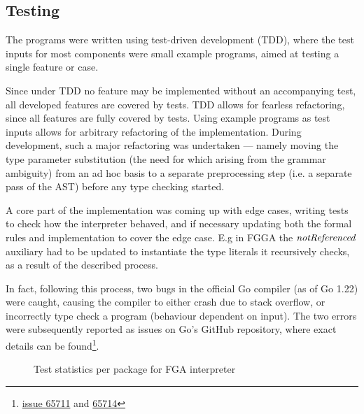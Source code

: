 \subsection{Testing}

The programs were written using test-driven development (TDD), where the test
inputs for most components were small example programs, aimed at testing a
single feature or case.

Since under TDD no feature may be implemented without an accompanying test, all
developed features are covered by tests. TDD allows for fearless refactoring,
since all features are fully covered by tests. Using example programs as test
inputs allows for arbitrary refactoring of the implementation. During
development, such a major refactoring was undertaken --- namely moving the type
parameter substitution (the need for which arising from the grammar ambiguity)
from an ad hoc basis to a separate preprocessing step (i.e. a separate pass of
the AST) before any type checking started.

A core part of the implementation was coming up with edge cases, writing tests
to check how the interpreter behaved, and if necessary updating both the formal
rules and implementation to cover the edge case. E.g in FGGA the $\mathit{notReferenced}$
auxiliary had to be updated to instantiate the type literals it recursively
checks, as a result of the described process.

In fact, following this process, two bugs in the official Go compiler (as of Go
1.22) were caught, causing the compiler to either crash due to stack overflow,
or incorrectly type check a program (behaviour dependent on input). The two
errors were subsequently reported as issues on Go's GitHub repository, where
exact details can be
found\footnote{\href{https://github.com/golang/go/issues/65711}{issue 65711} and
    \href{https://github.com/golang/go/issues/65714}{65714}}.

%


\begin{figure}
    \begin{center}
    \end{center}
    \caption{Test statistics per package for FGA interpreter\protect\footnotemark}
\end{figure}

